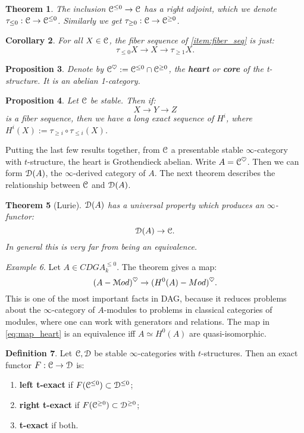 \documentclass[10pt,a4paper,reqno,oneside]{book} %
\theoremstyle{plain}
\newtheorem{thm}{Theorem}[section]
\newtheorem{prop}[thm]{Proposition}
\newtheorem{cor}[thm]{Corollary}
\theoremstyle{definition}
\newtheorem{defin}[thm]{Definition}
\theoremstyle{remark}
\newtheorem{eg}[thm]{Example}
\numberwithin{equation}{section}
\begin{document}
\begin{thm}
The inclusion $\mathcal C^{\leq 0} \to \mathcal C$ has a right adjoint, which we denote $\tau_{\leq 0} : \mathcal C \to \mathcal C^{\leq 0}$. Similarly
we get $\tau_{\geq 0} : \mathcal C \to \mathcal C^{\geq 0}$.
\end{thm}

\begin{cor}
For all $X \in \mathcal C$, the fiber sequence of \ref{item:fiber_seq} is just:
\[	\tau_{\leq 0} X \to X \to \tau_{\geq 1} X.	\]
\end{cor}

\begin{prop}
Denote by $\mathcal C^{\heartsuit} := \mathcal C^{\leq 0} \cap \mathcal C^{\geq 0}$, the \textbf{heart} or \textbf{core} of the t-structure. 
It is an abelian 1-category.
\end{prop}

\begin{prop}
Let $\mathcal C$ be stable. Then if:
\[	X \to Y \to Z	\]
is a fiber sequence, then we have a long exact sequence of $H^i$, where $H^i(X) := \tau_{\geq i} \circ \tau_{\leq i} (X)$.
\end{prop}

Putting the last few results together, from $\mathcal C$ a presentable stable $\infty$-category with $t$-structure, the heart 
is Grothendieck abelian. Write $A = \mathcal C^{\heartsuit}$. Then we can form $\mathcal D(A)$, the $\infty$-derived category of $A$.
The next theorem describes the relationship between $\mathcal C$ and $\mathcal D(A)$.

\begin{thm}[Lurie]
$\mathcal D(A)$ has a universal property which produces an $\infty$-functor:
\[	\mathcal D(A) \to \mathcal C.	\]
In general this is very far from being an equivalence.
\end{thm}

\begin{eg}
Let $A \in CDGA^{\leq 0}_k$. The theorem gives a map:
\begin{equation}
\label{eq:map_heart}
	(A-\mathcal M od)^{\heartsuit} \to  (H^0(A)-Mod)^{\heartsuit}.
\end{equation}
This is one of the most important facts
in DAG, because it reduces problems about the $\infty$-category of $A$-modules to problems in classical categories of modules,
where one can work with generators and relations. The map in \ref{eq:map_heart} is an equivalence iff $A \simeq H^0(A)$ 
are quasi-isomorphic.
\end{eg}

\begin{defin}
Let $\mathcal C, \mathcal D$ be stable $\infty$-categories with $t$-structures. Then an exact functor $F : \mathcal C \to \mathcal D$ is:
\begin{enumerate}
\item \textbf{left t-exact} if $F(\mathcal C^{\leq 0}) \subset \mathcal D^{\leq 0}$;
\item \textbf{right t-exact} if $F(\mathcal C^{\geq 0}) \subset \mathcal D^{\geq 0}$;
\item \textbf{t-exact} if both.
\end{enumerate}
\end{defin}
\end{document}
